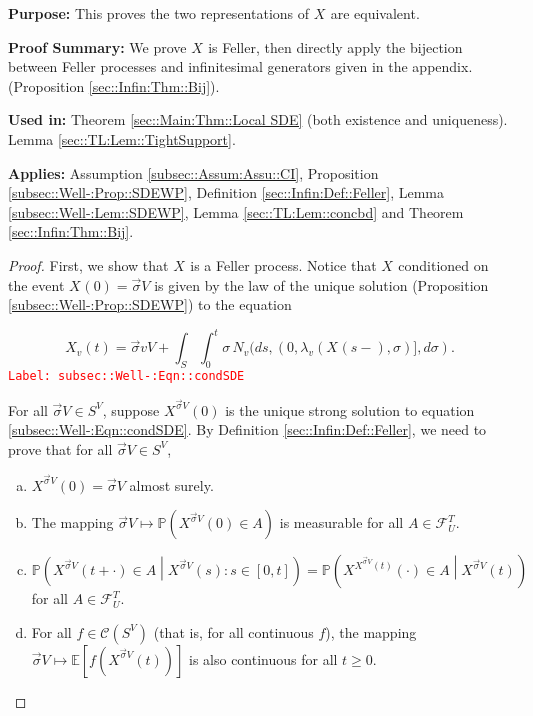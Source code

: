 \documentclass[12pt]{article}
\newcommand{\mb}{\mathbb}
\newcommand{\mc}{\mathcal}
\newcommand{\tr}{\textcolor{red}}
\newcommand{\labe}[1]{\tr{\texttt{Label: #1}}}
\newcommand{\purpose}{\textbf{Purpose: }}
\newcommand{\pfsum}{\textbf{Proof Summary: }}
\newcommand{\usein}{\textbf{Used in: }}
\newcommand{\app}{\textbf{Applies: }}
\newcommand{\pr}{\mb{P}}							%
\newcommand{\ex}[1]{\mb{E}\left[#1\right]}			%
\renewcommand{\v}{v}							%
\renewcommand{\U}{U}							%
\renewcommand{\S}{S}							%
\newcommand{\s}{\sigma}							%
\newcommand{\sv}{\vec{\s}}						%
\newcommand{\T}{T}								%
\renewcommand{\t}{t}							%
\newcommand{\poiss}[1]{N_{#1}}						%
\newcommand{\V}{V}									%
\renewcommand{\tt}{s}								%
\newcommand{\XState}[1]{\S^{#1}}				%
\newcommand{\rxvt}[2]{X_{#1}{(#2)}}					%
\newcommand{\rxvtn}[3]{X_{#1}^{#3}(#2)}				%
\newcommand{\rxvts}[2]{X_{#1}{#2}}					%
\newcommand{\rate}[1]{\lambda_{#1}}					%
\newcommand{\F}[2]{\mc{F}_{#1}^{#2}}				%
\newcommand{\cont}{\mc{C}}							%
\begin{document}
\purpose This proves the two representations of \(\rxvts{}{}\) are equivalent.

\pfsum We prove \(\rxvts{}{}\) is Feller, then directly apply the bijection between Feller processes and infinitesimal generators given in the appendix. (Proposition \ref{sec::Infin:Thm::Bij}).

\usein Theorem \ref{sec::Main:Thm::Local SDE} (both existence and uniqueness). Lemma \ref{sec::TL:Lem::TightSupport}.

\app Assumption \ref{subsec::Assum:Assu::CI}, Proposition \ref{subsec::Well-:Prop::SDEWP}, Definition \ref{sec::Infin:Def::Feller}, Lemma \ref{subsec::Well-:Lem::SDEWP}, Lemma \ref{sec::TL:Lem::concbd} and Theorem \ref{sec::Infin:Thm::Bij}.

\begin{proof}
First, we show that \(\rxvts{}{}\) is a Feller process. Notice that \(\rxvts{}{}\) conditioned on the event \(\rxvt{}{0} = \sv{}{\V}\) is given by the law of the unique solution (Proposition \ref{subsec::Well-:Prop::SDEWP}) to the equation

\begin{equation}
\rxvt{\v}{\t} = \sv{\v}{\V} + \int_\S\int_0^\t \s\,\poiss{\v}(d\tt,(0,\rate{\v}(\rxvt{}{\tt-},\s)],d\s).
\label{subsec::Well-:Eqn::condSDE}
\end{equation}
\labe{subsec::Well-:Eqn::condSDE}

For all \(\sv{}{\V}\in\S^\V\), suppose \(\rxvtn{}{0}{\sv{}{\V}}\) is the unique strong solution to equation \eqref{subsec::Well-:Eqn::condSDE}. By Definition \ref{sec::Infin:Def::Feller}, we need to prove that for all \(\sv{}{\V}\in \S^\V\),

\begin{enumerate}[(a)]
\item \(\rxvtn{}{0}{\sv{}{\V}} = \sv{}{\V}\) almost surely.

\item The mapping \(\sv{}{\V}\mapsto \pr\left(\rxvtn{}{0}{\sv{}{\V}}\in A\right)\) is measurable for all \(A\in \F{\U}{\T}\).

\item \(\pr\left(\rxvtn{}{\t+\cdot}{\sv{}{\V}}\in A\middle|\rxvtn{}{\tt}{\sv{}{\V}}:\tt \in [0,\t]\right) = \pr\left(\rxvtn{}{\cdot}{\rxvtn{}{\t}{\sv{}{\V}}} \in A\middle| \rxvtn{}{\t}{\sv{}{\V}} \right)\) for all \(A \in \F{\U}{\T}\).

\item For all \(f \in \cont(\S^\V)\) (that is, for all continuous \(f\)), the mapping \(\sv{}{\V}\mapsto \ex{f(\rxvtn{}{\t}{\sv{}{\V}})}\) is also continuous for all \(t\geq 0\).
\end{enumerate}


\end{proof}
\end{document}
